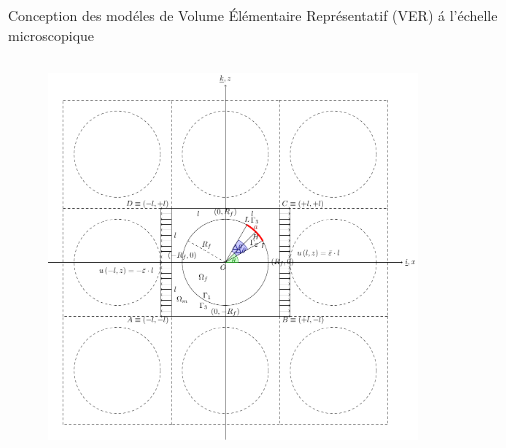 \documentclass[final]{beamer}
\begin{document}
\begin{frame}
\begin{center}
\begin{minipage}{\textwidth}
\begin{exampleblock}{\rule[-0.6ex]{0pt}{50pt}\centering\LARGE Conception des mod\'eles de Volume \'El\'ementaire Repr\'esentatif (VER) \'a l'\'echelle microscopique}
\begin{columns}
\begin{column}{0.15\textwidth}
\begin{figure}[!h]
   \includegraphics[width=\columnwidth]{periodicRVE_cc.pdf}
\end{figure}
\end{column}
\begin{column}{0.2\textwidth}  %
    \begin{center}
\captionsetup[subfigure]{labelformat=empty}
\begin{figure}[!h]
\centering
    \\

\end{figure}
\end{center}
\end{column}
\end{columns}
\end{exampleblock}
\end{minipage}
\end{center}
\end{frame}
\end{document}
